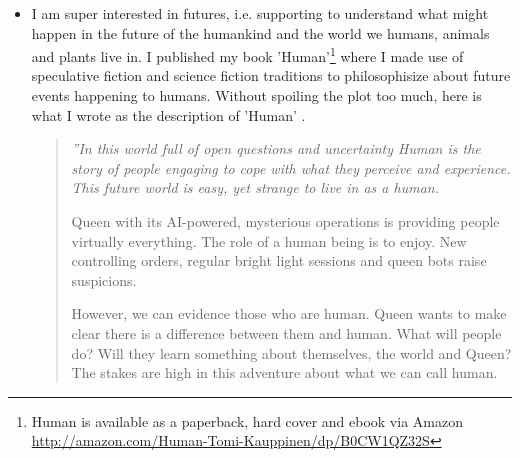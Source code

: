\documentclass[11pt,letterpaper]{article}
\newenvironment{itquote}
{\begin{quote}\itshape}
{\end{quote}}
\begin{document}
\begin{itemize}
  \item I am super interested in futures, i.e. supporting to understand what might happen in the future of the humankind and the world we humans, animals and plants live in. I published my book 'Human'\footnote{Human is available as a paperback, hard cover and ebook via Amazon \url{http://amazon.com/Human-Tomi-Kauppinen/dp/B0CW1QZ32S}} where I made use of speculative fiction and science fiction traditions to philosophisize about future events happening to humans. Without spoiling the plot too much, here is what I wrote as the description of 'Human' \cite{human-I}.
\begin{itquote}
''In this world full of open questions and uncertainty Human is the story of people engaging to cope with what they perceive and experience. This future world is easy, yet strange to live in as a human.

Queen with its AI-powered, mysterious operations is providing people virtually everything. The role of a human being is to enjoy. New controlling orders, regular bright light sessions and queen bots raise suspicions.

However, we can evidence those who are human. Queen wants to make clear there is a difference between them and human. What will people do? Will they learn something about themselves, the world and Queen? The stakes are high in this adventure about what we can call human.


\end{itquote}
\end{itemize}
\end{document}
